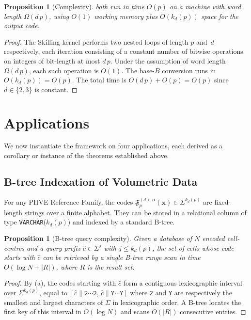 \documentclass[11pt,a4paper]{article}
\theoremstyle{plain}
\newtheorem{proposition}[theorem]{Proposition}
\theoremstyle{definition}
\theoremstyle{remark}
\newcommand{\Fc}{\mathfrak{F}}
\begin{document}
\begin{proposition}[Complexity]\label{prop:complexity}
 both run in time $O(p)$ on a
machine with word length $\Omega(d\,p)$, using $O(1)$ working memory
plus $O(k_d(p))$ space for the output code.
\end{proposition}

\begin{proof}
The Skilling kernel performs two nested loops of length $p$ and~$d$
respectively, each iteration consisting of a constant number of bitwise
operations on integers of bit-length at most $d\,p$. Under the assumption
of word length $\Omega(d\,p)$, each such operation is $O(1)$. The base-$B$
conversion runs in $O(k_d(p))=O(p)$. The total time is
$O(d\,p)+O(p)=O(p)$ since $d\in\{2,3\}$ is constant.
\end{proof}

\section{Applications}\label{sec:applications}

We now instantiate the framework on four applications, each derived as a
corollary or instance of the theorems established above.

\subsection{B-tree Indexation of Volumetric Data}\label{sec:app_btree}

For any PHVE Reference Family, the codes
$\Fc_p^{(d),\alpha}(\mathbf{x})\in\Sigma^{k_d(p)}$ are fixed-length
strings over a finite alphabet. They can be stored in a relational column
of type \texttt{VARCHAR}($k_d(p)$) and indexed by a standard B-tree.

\begin{proposition}[B-tree query complexity]\label{prop:btree}
Given a database of $N$ encoded cell-centres and a query prefix
$\hat c\in\Sigma^j$ with $j\leq k_d(p)$, the set of cells whose code
starts with $\hat c$ can be retrieved by a single B-tree range scan in
time $O(\log N + |R|)$, where $R$ is the result set.
\end{proposition}

\begin{proof}
By (a), the codes starting with $\hat c$ form a
contiguous lexicographic interval over $\Sigma^{k_d(p)}$, equal to
$[\hat c \| \mathtt{2}\cdots\mathtt{2},\,\hat c \| \mathtt{Y}\cdots\mathtt{Y}]$
where \texttt{2} and \texttt{Y} are respectively the smallest and largest
characters of $\Sigma$ in lexicographic order. A B-tree locates the first
key of this interval in $O(\log N)$ and scans $O(|R|)$ consecutive
entries.
\end{proof}
\end{document}
